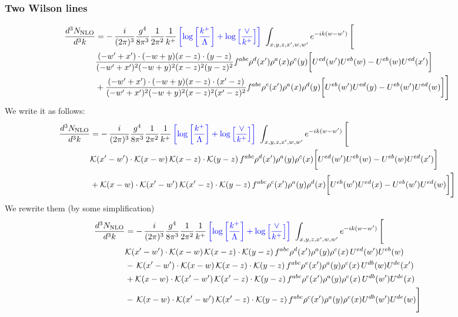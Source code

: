 \documentclass[aps,prd,amsmath,amssymb,nofootinbib]{revtex4-2}
\numberwithin{equation}{section}
\begin{document}
\subsubsection{Two Wilson lines}
\begin{align}
    \frac{d^{3}N_{\rm NLO}}{d^{3}k} & = -\,\frac{i}{(2\pi)^{3}}\frac{g^{4}}{8\pi^{3}}\frac{1}{2\pi^{2}} \frac{1}{k^{+}}\,{\color{blue}\left[\log{\left[\frac{k^{+}}{\Lambda}\right]}+\log{\left[\frac{\vee}{k^{+}}\right]}\right]}\,\,\int_{x,y,z,x^{\prime},w,w^{\prime}}e^{-ik(w-w^{\prime})}\, \Bigg[\notag \\ &  \frac{( - w' + x') \cdot ( - w + y) (x - z) \cdot (y - z)}{( - w' + x')^{2} ( - w + y)^{2} (x - z)^{2} (y - z)^{2}} f^{a b c} \rho^{d}(x') \rho^{a}(x) \rho^{c}(y) \bigg[U^{ed}(w') U^{e b}(w) - U^{e b}(w) U^{e d}(x')\bigg]\nonumber\\
    & + \frac{( - w' + x') \cdot ( - w + y) (x - z) \cdot (x' - z)}{( - w' + x')^{2} ( - w + y)^{2} (x - z)^{2} (x' - z)^{2}} f^{a b c} \rho^{c}(x') \rho^{a}(x) \rho^{d}(y) \bigg[U^{e b}(w') U^{e d}(y) - U^{eb}(w') U^{e d}(w) \bigg]\Bigg]
\end{align}
We write it as follows:
\begin{align}
    \frac{d^{3}N_{\rm NLO}}{d^{3}k} & = -\,\frac{i}{(2\pi)^{3}}\frac{g^{4}}{8\pi^{3}}\frac{1}{2\pi^{2}} \frac{1}{k^{+}}\,{\color{blue}\left[\log{\left[\frac{k^{+}}{\Lambda}\right]}+\log{\left[\frac{\vee}{k^{+}}\right]}\right]}\,\,\int_{x,y,z,x^{\prime},w,w^{\prime}}e^{-ik(w-w^{\prime})}\, \Bigg[\notag \\ &  \mathcal{K}(x'-w')\cdot \mathcal{K}(x-w)\, \mathcal{K}(x-z)\cdot \mathcal{K}(y-z)\, f^{a b c} \rho^{d}(x') \rho^{a}(y) \rho^{c}(x) \bigg[U^{ed}(w') U^{e b}(w) - U^{e b}(w) U^{e d}(x')\bigg]\nonumber\\
    & + \mathcal{K}(x-w)\cdot \mathcal{K}(x'-w')\, \mathcal{K}(x'-z)\cdot \mathcal{K}(y-z)\, f^{a b c} \rho^{c}(x') \rho^{a}(y) \rho^{d}(x) \bigg[U^{e b}(w') U^{e d}(x) - U^{eb}(w') U^{e d}(w) \bigg]\Bigg]
\end{align}
We rewrite them (by some simplification)
\begin{align}
    \frac{d^{3}N_{\rm NLO}}{d^{3}k} & = -\,\frac{i}{(2\pi)^{3}}\frac{g^{4}}{8\pi^{3}}\frac{1}{2\pi^{2}} \frac{1}{k^{+}}\,{\color{blue}\left[\log{\left[\frac{k^{+}}{\Lambda}\right]}+\log{\left[\frac{\vee}{k^{+}}\right]}\right]}\,\,\int_{x,y,z,x^{\prime},w,w^{\prime}}e^{-ik(w-w^{\prime})}\, \Bigg[\notag \\ &  \mathcal{K}(x'-w')\cdot \mathcal{K}(x-w)\, \mathcal{K}(x-z)\cdot \mathcal{K}(y-z)\, f^{a b c} \rho^{d}(x') \rho^{a}(y) \rho^{c}(x)\,U^{ed}(w') U^{e b}(w) \nonumber\\
    &  -\,\mathcal{K}(x'-w')\cdot \mathcal{K}(x-w)\, \mathcal{K}(x-z)\cdot \mathcal{K}(y-z)\, f^{a b c} \rho^{e}(x') \rho^{a}(y) \rho^{c}(x)\, U^{d b}(w) U^{de}(x')\nonumber\\
    & + \mathcal{K}(x-w)\cdot \mathcal{K}(x'-w')\, \mathcal{K}(x'-z)\cdot \mathcal{K}(y-z)\, f^{a b c} \rho^{c}(x') \rho^{a}(y) \rho^{e}(x)\,U^{d b}(w') U^{de}(x) \nonumber\\
    & -\,\mathcal{K}(x-w)\cdot \mathcal{K}(x'-w')\, \mathcal{K}(x'-z)\cdot \mathcal{K}(y-z)\, f^{a b c} \rho^{c}(x') \rho^{a}(y) \rho^{e}(x) U^{db}(w') U^{de}(w)\Bigg]
\end{align}
\end{document}
